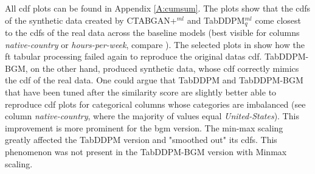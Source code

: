 All \gls{cdf} plots can be found in Appendix \ref{A:cumsum}.
The plots show that the \glspl{cdf} of the synthetic data created by CTABGAN+$^{ml}$ and TabDDPM$^{ml}_q$ come closest to
the \glspl{cdf} of the real data across the baseline models (best visible for columns \textit{native-country} or \textit{hours-per-week}, compare ).
The selected plots in  show how the \gls{ft} tabular processing failed again to reproduce the original datas \gls{cdf}.
TabDDPM-BGM, on the other hand, produced synthetic data, whose \gls{cdf} correctly mimics the \gls{cdf} of the real data.
One could argue that TabDDPM and TabDDPM-BGM that have been tuned after the similarity score are slightly better able to
reproduce \gls{cdf} plots for categorical columns whose categories are imbalanced (\eg see column \textit{native-country}, where the majority of values equal \textit{United-States}).
This improvement is more prominent for the \gls{bgm} version.
The min-max scaling greatly affected the TabDDPM version and "smoothed out" its \glspl{cdf}.
This phenomenon was not present in the TabDDPM-BGM version with Minmax scaling.

